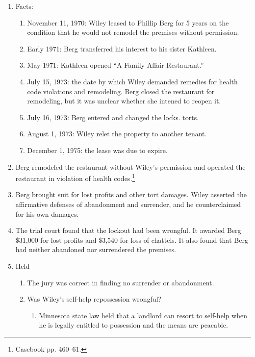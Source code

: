 \begin{enumerate}
    \item Facts:
    \begin{enumerate}
        \item November 11, 1970: Wiley leased to Phillip Berg for 5 years on 
        the condition that he would not remodel the premises without 
        permission.
        \item Early 1971: Berg transferred his interest to his sister 
        Kathleen.
        \item May 1971: Kathleen opened ``A Family Affair Restaurant.''
        \item July 15, 1973: the date by which Wiley demanded remedies for
        health code violations and remodeling. Berg closed the restaurant for 
        remodeling, but it was unclear whether she intened to reopen it.
        \item July 16, 1973: Berg entered and changed the locks.
        torts.
        \item August 1, 1973: Wiley relet the property to another tenant.
        \item December 1, 1975: the lease was due to expire.
    \end{enumerate}
    \item Berg remodeled the restaurant without Wiley's permission and 
    operated the restaurant in violation of health codes.\footnote{Casebook 
    pp. 460--61.}
    \item Berg brought suit for lost profits and other tort damages. Wiley 
    asserted the affirmative defenses of abandonment and surrender, and he 
    counterclaimed for his own damages. 
    \item The trial court found that the lockout had been wrongful. It awarded 
    Berg \$31,000 for lost profits and \$3,540 for loss of chattels. It also 
    found that Berg had neither abandoned nor surrendered the premises.
    \item Held
    \begin{enumerate}
        \item The jury was correct in finding no surrender or abandonment.
        \item Was Wiley's self-help repossession wrongful?
        \begin{enumerate}
            \item Minnesota state law held that a landlord can resort to 
            self-help when he is legally entitled to possession and the means 
            are peacable.

\end{enumerate}
\end{enumerate}
\end{enumerate}
